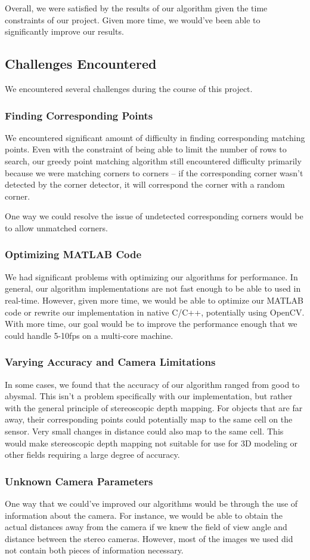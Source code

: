 Overall, we were satisfied by the results of our algorithm given the time constraints of our project. Given more time, we would've been able to significantly improve our results. 

\subsection{Challenges Encountered}
\label{conclusion:challenges}
We encountered several challenges during the course of this project. 
\subsubsection{Finding Corresponding Points}
We encountered significant amount of difficulty in finding corresponding matching points. Even with the constraint of being able to limit the number of rows to search, our greedy point matching algorithm still encountered difficulty primarily because we were matching corners to corners -- if the corresponding corner wasn't detected by the corner detector, it will correspond the corner with a random corner. 

One way we could resolve the issue of undetected corresponding corners would be to allow unmatched corners. 

\subsubsection{Optimizing MATLAB Code}
We had significant problems with optimizing our algorithms for performance. In general, our algorithm implementations are not fast enough to be able to used in real-time. However, given more time, we would be able to optimize our MATLAB code or rewrite our implementation in native C/C++, potentially using OpenCV. With more time, our goal would be to improve the performance enough that we could handle 5-10fps on a multi-core machine. 

\subsubsection{Varying Accuracy and Camera Limitations}
In some cases, we found that the accuracy of our algorithm ranged from good to abysmal. This isn't a problem specifically with our implementation, but rather with the general principle of stereoscopic depth mapping. For objects that are far away, their corresponding points could potentially map to the same cell on the sensor. Very small changes in distance could also map to the same cell. This would make stereoscopic depth mapping not suitable for use for 3D modeling or other fields requiring a large degree of accuracy. 

\subsubsection{Unknown Camera Parameters}
One way that we could've improved our algorithms would be through the use of information about the camera. For instance, we would be able to obtain the actual distances away from the camera if we knew the field of view angle and distance between the stereo cameras. However, most of the images we used did not contain both pieces of information necessary. 